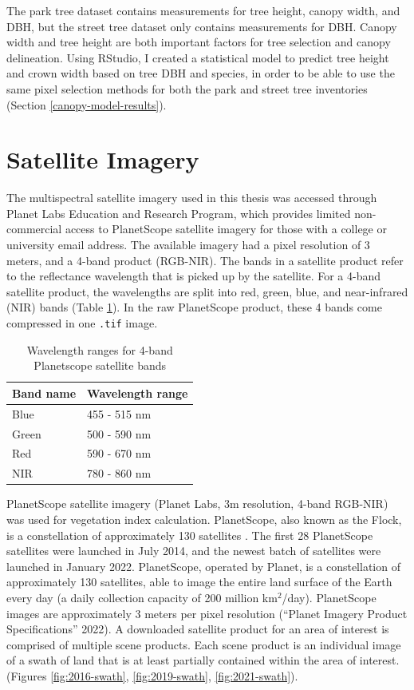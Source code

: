 \documentclass[12pt,twoside]{reedthesis}
\begin{document}
The park tree dataset contains measurements for tree height, canopy
width, and DBH, but the street tree dataset only contains measurements
for DBH. Canopy width and tree height are both important factors for
tree selection and canopy delineation. Using RStudio, I created a
statistical model to predict tree height and crown width based on tree
DBH and species, in order to be able to use the same pixel selection
methods for both the park and street tree inventories (Section
\ref{canopy-model-results}).

\hypertarget{satellite-imagery}{%
\section{Satellite Imagery}\label{satellite-imagery}}

The multispectral satellite imagery used in this thesis was accessed
through Planet Labs Education and Research Program, which provides
limited non-commercial access to PlanetScope satellite imagery for those
with a college or university email address. The available imagery had a
pixel resolution of 3 meters, and a 4-band product (RGB-NIR). The bands
in a satellite product refer to the reflectance wavelength that is
picked up by the satellite. For a 4-band satellite product, the
wavelengths are split into red, green, blue, and near-infrared (NIR)
bands (Table \ref{tab:wavelength}). In the raw PlanetScope product,
these 4 bands come compressed in one \texttt{.tif} image.
\begin{longtable}[t]{ll}
\caption[4-band satellite wavelength ranges]{\label{tab:wavelength}Wavelength ranges for 4-band Planetscope satellite bands}\\
\toprule
Band name & Wavelength range\\
\midrule
Blue & 455 - 515 nm\\
Green & 500 - 590 nm\\
Red & 590 - 670 nm\\
NIR & 780 - 860 nm\\
\bottomrule
\end{longtable}
PlanetScope satellite imagery (Planet Labs, 3m resolution, 4-band
RGB-NIR) was used for vegetation index calculation. PlanetScope, also
known as the Flock, is a constellation of approximately 130 satellites .
The first 28 PlanetScope satellites were launched in July 2014, and the
newest batch of satellites were launched in January 2022. PlanetScope,
operated by Planet, is a constellation of approximately 130 satellites,
able to image the entire land surface of the Earth every day (a daily
collection capacity of 200 million km\(^2\)/day). PlanetScope images are
approximately 3 meters per pixel resolution ({``Planet Imagery Product Specifications''} 2022). A
downloaded satellite product for an area of interest is comprised of
multiple scene products. Each scene product is an individual image of a
swath of land that is at least partially contained within the area of
interest. (Figures \ref{fig:2016-swath}, \ref{fig:2019-swath},
\ref{fig:2021-swath}).
\end{document}
